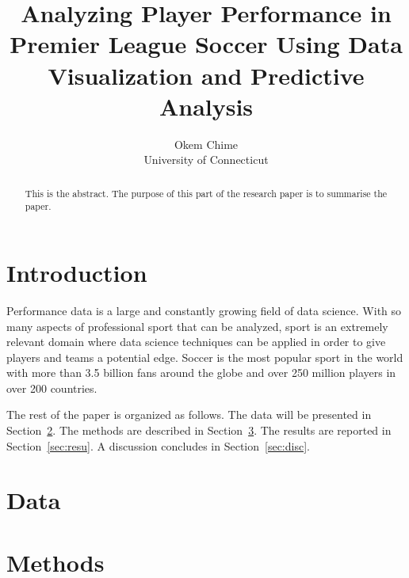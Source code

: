 \documentclass[12pt]{article}
\title{Analyzing Player Performance in Premier League Soccer Using 
Data Visualization and Predictive Analysis}
\author{Okem Chime\\
  University of Connecticut
}
\begin{document}
\maketitle

\begin{abstract}
This is the abstract. The purpose of this part of the research paper is to
summarise the paper.

\end{abstract}


\section{Introduction}
\label{sec:intro}

\begin{comment}
The introduction is used to a refernce framework for the reader. 
The aim of this section is to answer three questions:
Why is the topic important/interesting?
What has been done on this topic in the literature?
What is your contribution?
\end{comment}

Performance data is a large and constantly growing field of data science. With
so many aspects of professional sport that can be analyzed, sport is an 
extremely relevant domain where data science techniques can be applied in order
to give players and teams a potential edge. Soccer is the most popular sport in
the world with more than 3.5 billion fans around the globe and over 250 million
players in over 200 countries.

The rest of the paper is organized as follows.
The data will be presented in Section~\ref{sec:data}.
The methods are described in Section~\ref{sec:meth}.
The results are reported in Section~\ref{sec:resu}.
A discussion concludes in Section~\ref{sec:disc}.


\section{Data}
\label{sec:data}

\begin{comment}
Utilize this segment to provide an account of the data essential for addressing
your research inquiries. 
\end{comment}


\section{Methods}
\label{sec:meth}
\end{document}
